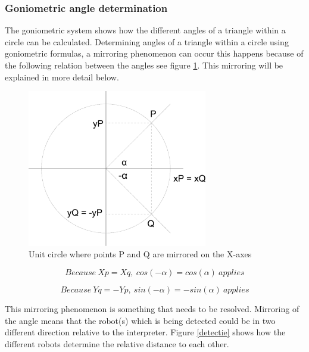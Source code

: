 \documentclass[10pt,a4paper]{article}
\begin{document}
\subsubsection{Goniometric angle determination}
The goniometric system shows how the different angles of a triangle within a circle can be calculated. Determining angles of a triangle within a circle using goniometric formulas, a mirroring phenomenon can occur this happens because of the following relation between the angles see figure \ref{circle}. This mirroring will be explained in more detail below.

\begin{figure}[H]
\centering
\includegraphics[width=0.7\textwidth]{Cirkel.pdf}
\caption{Unit circle where points P and Q are mirrored on the X-axes}
\label{circle}
\end{figure}

\begin{equation}
Because\ Xp = Xq,\ cos(-\alpha) = cos(\alpha)\ applies
\end{equation}

\begin{equation}
Because\ Yq = -Yp,\ sin(-\alpha) = -sin(\alpha)\ applies
\end{equation}

This mirroring phenomenon is something that needs to be resolved. Mirroring of the angle means that the robot(s) which is being detected could be in two different direction relative to the interpreter. Figure \ref{detectie} shows how the different robots determine the relative distance to each other. 
\end{document}
